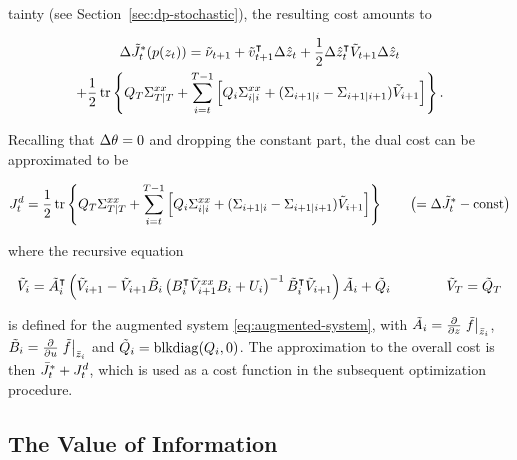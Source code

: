 \pagebreak[4]
\noindent
tainty (see Section~\ref{sec:dp-stochastic}), the resulting cost amounts to
\cite{Tse.Bar-Shalom.ea:1973:Wide-sense}
\begin{fullwidth}\vspace{-\baselineskip}
\begin{multline}
  \Delta\tilde{J}^*_t(p(z_t)) = \tilde\nu_{t+1}
  + \tilde{v}_{t+1}^{\intercal}\Delta\hat z_t +
  \frac{1}{2}  \Delta\hat z_t^{\intercal} \tilde{V}_{t+1}\Delta\hat z_t \\
    + \frac{1}{2} \operatorname*{tr}\left\{ Q_T\Sigma^{xx}_{T|T} +
    \sum_{i=t}^{T-1} \left[Q_i
    \Sigma^{xx}_{i|i} + (\Sigma_{i+1|i}
    - \Sigma_{i+1|i+1} ) \tilde{V}_{i+1}\right]\right\}.
\end{multline}
\end{fullwidth}
Recalling that $\Delta \theta=0$ and dropping the constant part, the dual cost can
be approximated to be
\begin{fullwidth}\vspace{-\baselineskip}
\begin{equation}
\label{eq:dual-cost}
  J^d_\tk = \frac{1}{2} \tr\left\{ \SC_T\Sigma^{xx}_{T|T} + \sum_{\i=\tk}^{T-1}
    \left[ \SC_\i \Sigma^{xx}_{\i|\i} + (\Sigma_{\i+1|\i} - \Sigma_{\i+1|\i+1} )
\tilde\VM_{\i+1} \right] \right\} \qq \left(=\Delta\tilde J_\tk^* -
\const\right)
\end{equation}
\end{fullwidth}
where the recursive equation
\begin{fullwidth}\vspace{-\baselineskip}
\begin{equation}
  \label{eq:dp-perturbed}
    \tilde\VM_\i =
\Ap_\i\T\left(\tilde\VM_{\i+1}-\tilde\VM_{\i+1}\Bp_\i\left(B_\i\T
\tilde\VM^{xx}_{\i+1} B_\i
        + U_\i\right)\inv \Bp_\i\T \tilde\VM_{\i+1} \right) \Ap_\i +
\tilde\SC_\i
\qqqq \tilde\VM_T =
      \tilde\SC_T
\end{equation}
\end{fullwidth}
is defined for the augmented system \eqref{eq:augmented-system}, with $\tilde A_i =
\frac{\partial}{\partial z}\left.\tilde f\right|_{\bar z_i}$, $\tilde B_i = \frac{\partial}{\partial
u}\left.\tilde f\right|_{\bar z_i}$ and $\tilde{Q}_i
=\operatorname{blkdiag}(Q_i,0)$. The approximation to the overall cost is then $\bar J^*_t
+ J^d_t$, which is used as a cost function in the subsequent optimization
procedure.

\subsection{The Value of Information}
\label{sec:value-of-information}

